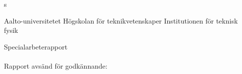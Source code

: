 \begin{titlepage}
{\fi

\if\mylang s

\noindent
\fontsize{12}{14}\selectfont
Aalto-universitetet \newline
Högskolan för teknikvetenskaper \newline
Institutionen för teknisk fysik

\vspace{40mm}

\noindent
\fontsize{14}{16}\selectfont
\myauthor

\vspace{10mm}

\noindent
\fontsize{18}{22}\selectfont
\textbf{\mytitle}

\vspace{90mm}

\noindent
\fontsize{12}{14}\selectfont
Specialarbeterapport \\[4mm]
\mycourse \\[4mm]
Rapport avsänd för godkännande: \mypubdate \\[4mm]
\mbox{}\\[4mm]
 \mysupervisor \\[4mm]
 \myinstructor

\fi

} %

\end{titlepage}

\newpage

\thispagestyle{empty}
\mbox{}

\newpage
